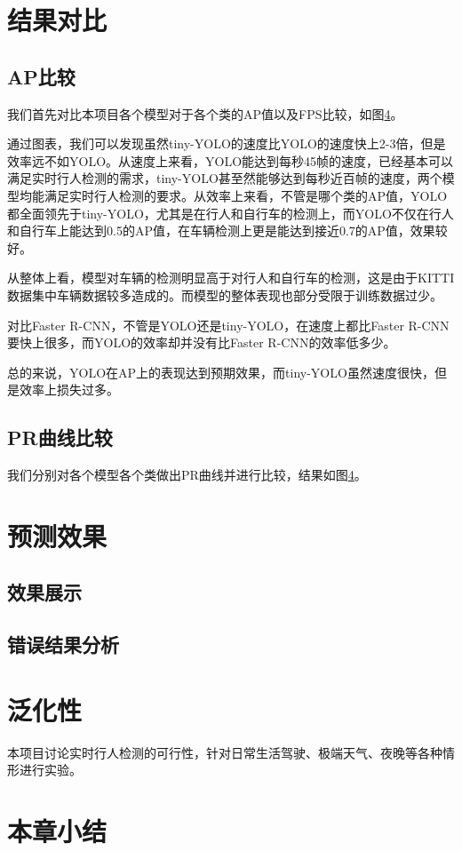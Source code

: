 \section{结果对比}{
	\subsection{AP比较}
	我们首先对比本项目各个模型对于各个类的AP值以及FPS比较，如图\ref{}。

	通过图表，我们可以发现虽然tiny-YOLO的速度比YOLO的速度快上2-3倍，但是效率远不如YOLO。从速度上来看，YOLO能达到每秒45帧的速度，已经基本可以满足实时行人检测的需求，tiny-YOLO甚至然能够达到每秒近百帧的速度，两个模型均能满足实时行人检测的要求。从效率上来看，不管是哪个类的AP值，YOLO都全面领先于tiny-YOLO，尤其是在行人和自行车的检测上，而YOLO不仅在行人和自行车上能达到0.5的AP值，在车辆检测上更是能达到接近0.7的AP值，效果较好。

	从整体上看，模型对车辆的检测明显高于对行人和自行车的检测，这是由于KITTI数据集中车辆数据较多造成的。而模型的整体表现也部分受限于训练数据过少。

	对比Faster R-CNN，不管是YOLO还是tiny-YOLO，在速度上都比Faster R-CNN要快上很多，而YOLO的效率却并没有比Faster R-CNN的效率低多少。

	总的来说，YOLO在AP上的表现达到预期效果，而tiny-YOLO虽然速度很快，但是效率上损失过多。

	\subsection{PR曲线比较}
	我们分别对各个模型各个类做出PR曲线并进行比较，结果如图\ref{}。
}

\section{预测效果}{
	\subsection{效果展示}

	\subsection{错误结果分析}
}

\section{泛化性}{
	本项目讨论实时行人检测的可行性，针对日常生活驾驶、极端天气、夜晚等各种情形进行实验。
}

\section{本章小结}


